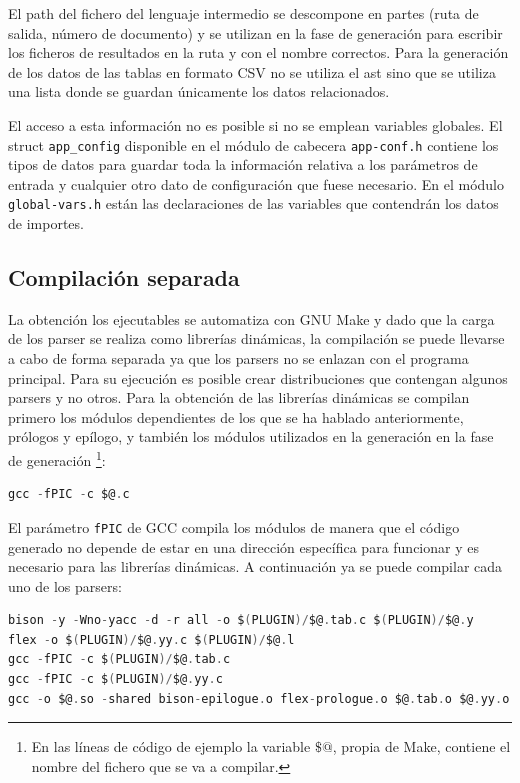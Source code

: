 El path del fichero del lenguaje intermedio se descompone en partes (ruta de salida, número de documento) y se utilizan en la fase de generación para escribir los ficheros de resultados en la ruta y con el nombre correctos. Para la generación de los datos de las tablas en formato CSV no se utiliza el \acrshort{ast} sino que se utiliza una lista donde se guardan únicamente los datos relacionados.

El acceso a esta información no es posible si no se emplean variables globales. El struct \verb|app_config| disponible en el módulo de cabecera \verb|app-conf.h| contiene los tipos de datos para guardar toda la información relativa a los parámetros de entrada y cualquier otro dato de configuración que fuese necesario. En el módulo \verb|global-vars.h| están las declaraciones de las variables que contendrán los datos de importes.

\subsection{Compilación separada}

La obtención los ejecutables se automatiza con GNU Make y dado que la carga de los parser se realiza como librerías dinámicas, la compilación se puede llevarse a cabo de forma separada ya que los parsers no se enlazan con el programa principal. Para su ejecución es posible crear distribuciones que contengan algunos parsers y no otros.
Para la obtención de las librerías dinámicas se compilan primero los módulos dependientes de los que se ha hablado anteriormente, prólogos y epílogo, y también los módulos utilizados en la generación en la fase de generación \footnote{En las líneas de código de ejemplo la variable $ \$@ $, propia de Make, contiene el nombre del fichero que se va a compilar.}:

\begin{lstlisting}[language=C,caption={},label={}]
gcc -fPIC -c $@.c
\end{lstlisting}

El parámetro \verb|fPIC| de GCC compila los módulos de manera que el código generado no depende de estar en una dirección específica para funcionar y es necesario para las librerías dinámicas. A continuación ya se puede compilar cada uno de los parsers:

\begin{lstlisting}[language=C,caption={},label={}]
bison -y -Wno-yacc -d -r all -o $(PLUGIN)/$@.tab.c $(PLUGIN)/$@.y
flex -o $(PLUGIN)/$@.yy.c $(PLUGIN)/$@.l
gcc -fPIC -c $(PLUGIN)/$@.tab.c
gcc -fPIC -c $(PLUGIN)/$@.yy.c
gcc -o $@.so -shared bison-epilogue.o flex-prologue.o $@.tab.o $@.yy.o
\end{lstlisting}

